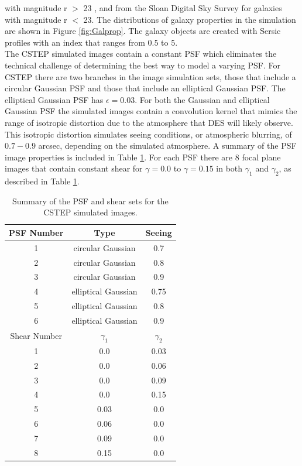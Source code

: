 with magnitude r $ > $ 23 , and from the Sloan Digital Sky Survey for
galaxies with magnitude r $ < $ 23. The distributions of galaxy
properties in the simulation are shown in Figure \ref{fig:Galprop}. 
The galaxy objects are created with Sersic profiles with an
index that ranges from 0.5 to 5.  \\
\indent The CSTEP simulated images contain a constant
PSF which eliminates the technical challenge of determining the best
way to model a varying PSF. For CSTEP there are two
branches in the image simulation sets, those that include a circular
Gaussian PSF and those that include an elliptical Gaussian PSF. 
The elliptical Gaussian PSF has $ \epsilon =
0.03 $. For both the Gaussian and elliptical Gaussian
PSF the simulated images contain a convolution kernel that mimics the
range of isotropic distortion due to the atmosphere that DES will
likely observe. This isotropic distortion simulates seeing conditions,
or atmospheric blurring, of $ 0.7 - 0.9 $ arcsec, depending on the simulated atmosphere.
A summary of the PSF image properties is included in Table \ref{table:tab2}. 
For each PSF there are 8 focal plane images that contain constant
shear for $\gamma = 0.0$ to $\gamma = 0.15$ in both
$\gamma_1$ and $\gamma_2$, as described in Table \ref{table:tab2}.  
\begin{table}
\begin{centering}
\begin{tabular}{ccc}
\hline
PSF Number & Type & Seeing  \\
\hline
1 & circular Gaussian & 0.7 \\
2 & circular Gaussian & 0.8 \\
3 & circular Gaussian & 0.9 \\
4 & elliptical Gaussian & 0.75 \\
5 & elliptical Gaussian & 0.8  \\
6 & elliptical Gaussian & 0.9  \\
\hline
\hline
Shear Number & $ \gamma_1 $ & $ \gamma_2 $  \\
\hline
1 &  0.0 & 0.03 \\
2 &  0.0 & 0.06 \\
3 &  0.0 & 0.09 \\
4 &  0.0 & 0.15 \\
5 &  0.03 & 0.0 \\
6 &  0.06 & 0.0 \\
7 &  0.09 & 0.0 \\
8 &  0.15 & 0.0 \\
\hline
\end{tabular}
\end{centering}
\caption{ Summary of the PSF and shear sets for the CSTEP simulated images. }
\label{table:tab2}
\end{table}
